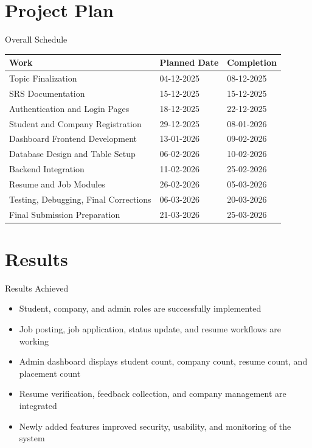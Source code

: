 \documentclass{beamer}
\begin{document}
\section{Project Plan}
\begin{frame}{Overall Schedule}
\scriptsize
\renewcommand{\arraystretch}{1.12}
\begin{center}
\begin{tabular}{|p{4.25cm}|p{2.35cm}|p{2.35cm}|}
\hline
\textbf{Work} & \textbf{Planned Date} & \textbf{Completion} \\ \hline
Topic Finalization & 04-12-2025 & 08-12-2025 \\ \hline
SRS Documentation & 15-12-2025 & 15-12-2025 \\ \hline
Authentication and Login Pages & 18-12-2025 & 22-12-2025 \\ \hline
Student and Company Registration & 29-12-2025 & 08-01-2026 \\ \hline
Dashboard Frontend Development & 13-01-2026 & 09-02-2026 \\ \hline
Database Design and Table Setup & 06-02-2026 & 10-02-2026 \\ \hline
Backend Integration & 11-02-2026 & 25-02-2026 \\ \hline
Resume and Job Modules & 26-02-2026 & 05-03-2026 \\ \hline
Testing, Debugging, Final Corrections & 06-03-2026 & 20-03-2026 \\ \hline
Final Submission Preparation & 21-03-2026 & 25-03-2026 \\ \hline
\end{tabular}
\end{center}
\end{frame}

\section{Results}
\begin{frame}{Results Achieved}
\small
\begin{itemize}
\item Student, company, and admin roles are successfully implemented
\item Job posting, job application, status update, and resume workflows are working
\item Admin dashboard displays student count, company count, resume count, and placement count
\item Resume verification, feedback collection, and company management are integrated
\item Newly added features improved security, usability, and monitoring of the system
\end{itemize}
\end{frame}
\end{document}
